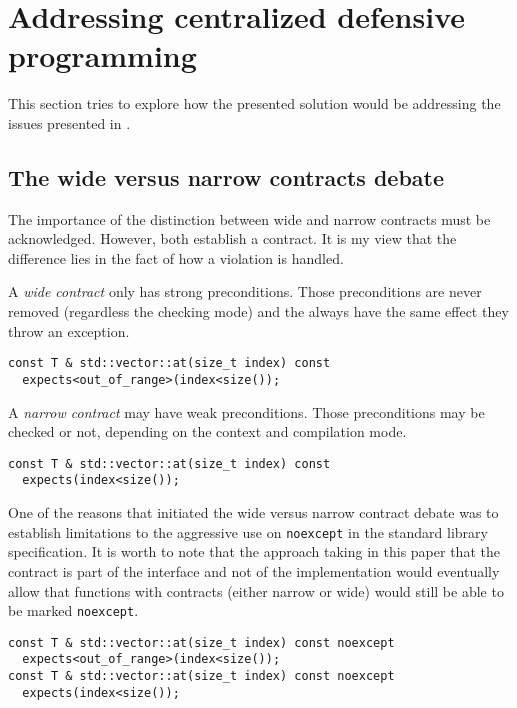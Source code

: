 \section{Addressing centralized defensive programming}

This section tries to explore how the presented solution would be addressing the
issues presented in \cite{n3997}.

\subsection{The wide versus narrow contracts debate}

The importance of the distinction between wide and narrow contracts must be
acknowledged. However, both establish a contract. It is my view that the
difference lies in the fact of how a violation is handled.

A \emph{wide contract} only has strong preconditions. Those preconditions are never
removed (regardless the checking mode) and the always have the same effect they
throw an exception.

\begin{lstlisting}
const T & std::vector::at(size_t index) const
  expects<out_of_range>(index<size());
\end{lstlisting}

A \emph{narrow contract} may have weak preconditions. Those preconditions may be
checked or not, depending on the context and compilation mode.

\begin{lstlisting}
const T & std::vector::at(size_t index) const
  expects(index<size());
\end{lstlisting}

One of the reasons that initiated the wide versus narrow contract debate was to
establish limitations to the aggressive use on \texttt{noexcept} in the standard
library specification. It is worth to note that the approach taking in this
paper that the contract is part of the interface and not of the implementation
would eventually allow that functions with contracts (either narrow or wide)
would still be able to be marked \texttt{noexcept}.

\begin{lstlisting}
const T & std::vector::at(size_t index) const noexcept
  expects<out_of_range>(index<size());
const T & std::vector::at(size_t index) const noexcept
  expects(index<size());
\end{lstlisting}

